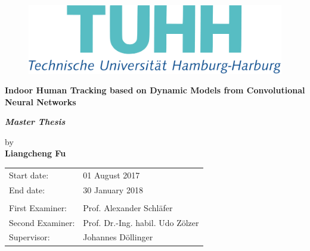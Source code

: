 \documentclass[12pt, a4paper, twoside, openright]{report}
\begin{document}
\thispagestyle{empty}
\newpage

\vspace{5cm}
\begin{figure}[H]
  \centering
    \includegraphics[width=.6\textwidth]{figures/logo_tuhh.pdf}
\end{figure}



\begin{center}
\vspace{2cm}

\begin{minipage}{.9\linewidth}
{\centering\Large\bf Indoor Human Tracking based on Dynamic Models from Convolutional Neural Networks \par} 
\end{minipage}

\large 


\vspace{1.5cm}
{\large{\bf \it Master Thesis} %
}

\vspace{0.2cm}
{
\large by \\[.1cm] 
{\bf \large Liangcheng Fu}\\[1.5cm]
}

\vfill
\begin{tabular}{ll}
Start date:& 01 August 2017\\
End date:& 30 January 2018\\
\\
First Examiner:&  Prof. Alexander Schl\"afer\\
Second Examiner:&  Prof. Dr.-Ing. habil. Udo Z\"olzer\\
Supervisor:&  Johannes D\"ollinger\\
\end{tabular}
\end{center}
\end{document}
